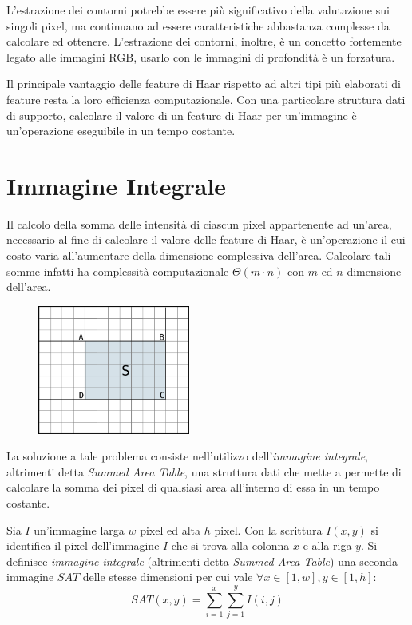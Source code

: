             L'estrazione dei contorni potrebbe essere più significativo della valutazione sui singoli pixel, ma continuano ad essere caratteristiche abbastanza complesse da calcolare ed ottenere.
            L'estrazione dei contorni, inoltre, è un concetto fortemente legato alle immagini RGB, usarlo con le immagini di profondità è un forzatura.

            Il principale vantaggio delle feature di Haar rispetto ad altri tipi più elaborati di feature resta la loro efficienza computazionale.
            Con una particolare struttura dati di supporto, calcolare il valore di un feature di Haar per un'immagine è un'operazione eseguibile in un tempo costante.
            
    \section{Immagine Integrale}
    \label{sec:integral_image}
        Il calcolo della somma delle intensità di ciascun pixel appartenente ad un'area, necessario al fine di calcolare il valore delle feature di Haar, è un'operazione il cui costo varia all'aumentare della dimensione complessiva dell'area.
        Calcolare tali somme infatti ha complessità computazionale $\Theta(m \cdot n)$ con $m$ ed $n$ dimensione dell'area.

        \begin{figure}
            \centering
            \includegraphics[width=5cm]{img/integral_image_sum.png}
            \caption{}
            \label{fig:integral_image_sum}
        \end{figure}

        La soluzione a tale problema consiste nell'utilizzo dell'\emph{immagine integrale}, altrimenti detta \emph{Summed Area Table}, una struttura dati che mette a permette di calcolare la somma dei pixel di qualsiasi area all'interno di essa in un tempo costante.

        \begin{definition}
            Sia $I$ un'immagine larga $w$ pixel ed alta $h$ pixel. Con la scrittura $I(x, y)$ si identifica il pixel dell'immagine $I$ che si trova alla colonna $x$ e alla riga $y$.
            Si definisce \emph{immagine integrale} (altrimenti detta \emph{Summed Area Table}) una seconda immagine $SAT$ delle stesse dimensioni per cui vale $\forall x \in [1,w], y \in [1,h]$:
            \begin{equation}
                SAT(x, y) = \sum_{i = 1}^{x} \sum_{j = 1}^{y} I(i, j)
            \end{equation}
        \end{definition}

